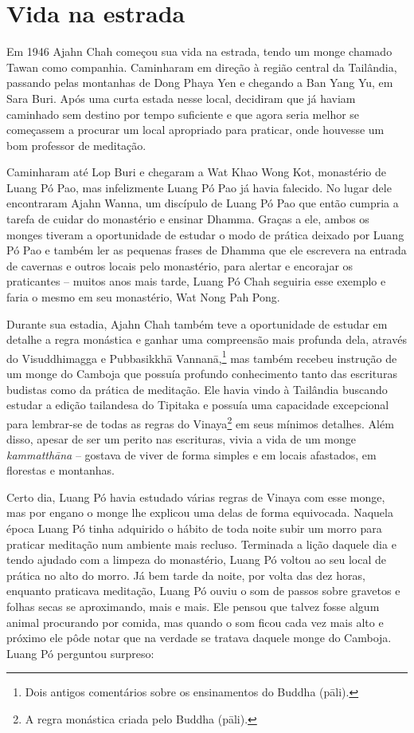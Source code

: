 \chapter{Vida na estrada}

Em 1946 Ajahn Chah começou sua vida na estrada, tendo um monge chamado
Tawan como companhia. Caminharam em direção à região central da
Tailândia, passando pelas montanhas de Dong Phaya Yen e chegando a Ban
Yang Yu, em Sara Buri. Após uma curta estada nesse local, decidiram que
já haviam caminhado sem destino por tempo suficiente e que agora seria
melhor se começassem a procurar um local apropriado para praticar, onde
houvesse um bom professor de meditação.

Caminharam até Lop Buri e chegaram a Wat Khao Wong Kot, monastério de
Luang Pó Pao, mas infelizmente Luang Pó Pao já havia falecido. No lugar
dele encontraram Ajahn Wanna, um discípulo de Luang Pó Pao que então
cumpria a tarefa de cuidar do monastério e ensinar Dhamma. Graças a ele,
ambos os monges tiveram a oportunidade de estudar o modo de prática
deixado por Luang Pó Pao e também ler as pequenas frases de Dhamma que
ele escrevera na entrada de cavernas e outros locais pelo monastério,
para alertar e encorajar os praticantes -- muitos anos mais tarde, Luang
Pó Chah seguiria esse exemplo e faria o mesmo em seu monastério, Wat
Nong Pah Pong.

Durante sua estadia, Ajahn Chah também teve a oportunidade de estudar em
detalhe a regra monástica e ganhar uma compreensão mais profunda dela,
através do Visuddhimagga e Pubbasikkhā Vannanā,\footnote{Dois antigos
  comentários sobre os ensinamentos do Buddha (pāli).} mas também
recebeu instrução de um monge do Camboja que possuía profundo
conhecimento tanto das escrituras budistas como da prática de meditação.
Ele havia vindo à Tailândia buscando estudar a edição tailandesa do
Tipitaka e possuía uma capacidade excepcional para lembrar-se de todas
as regras do Vinaya\footnote{A regra monástica criada pelo Buddha
  (pāli).} em seus mínimos detalhes. Além disso, apesar de ser um perito
nas escrituras, vivia a vida de um monge \emph{kammatthāna} -- gostava
de viver de forma simples e em locais afastados, em florestas e
montanhas.

Certo dia, Luang Pó havia estudado várias regras de Vinaya com esse
monge, mas por engano o monge lhe explicou uma delas de forma
equivocada. Naquela época Luang Pó tinha adquirido o hábito de toda
noite subir um morro para praticar meditação num ambiente mais recluso.
Terminada a lição daquele dia e tendo ajudado com a limpeza do
monastério, Luang Pó voltou ao seu local de prática no alto do morro. Já
bem tarde da noite, por volta das dez horas, enquanto praticava
meditação, Luang Pó ouviu o som de passos sobre gravetos e folhas secas
se aproximando, mais e mais. Ele pensou que talvez fosse algum animal
procurando por comida, mas quando o som ficou cada vez mais alto e
próximo ele pôde notar que na verdade se tratava daquele monge do
Camboja. Luang Pó perguntou surpreso:


